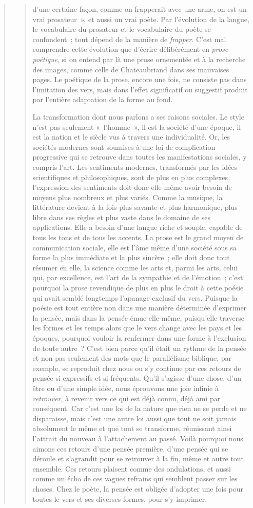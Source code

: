 \documentclass[french,twoside]{book} %
\begin{document}
\begin{verse}
\begin{verse}
d’une certaine façon, comme on frapperait avec une arme, on est un vrai prosateur », et aussi un vrai poète. Par l’évolution de la langue, le vocabulaire du prosateur et le vocabulaire du poète se confondent ; tout dépend de la manière de \emph{frapper}. C’est mal comprendre cette évolution que d’écrire délibérément en \emph{prose poétique}, si on entend par là une prose ornementée et à la recherche des images, comme celle de Chateaubriand dans ses mauvaises pages. Le poétique de la prose, encore une fois, ne consiste pas dans l’imitation des vers, mais dans l’effet significatif ou suggestif produit par l’entière adaptation de la forme au fond.\par
La transformation dont nous parlons a ses raisons sociales. Le style n’est pas seulement « l’homme », il est la société d’une époque, il est la nation et le siècle vus à travers une individualité. Or, les sociétés modernes sont soumises à une loi de complication progressive qui se retrouve dans toutes les manifestations sociales, y compris l’art. Les sentiments modernes, transformés par les idées scientifiques et philosophiques, sont de plus en plus complexes, l’expression des sentiments doit donc elle-même avoir besoin de moyens plus nombreux et plus variés. Comme la musique, la littérature devient à la fois plus savante et plus harmonique, plus libre dans ses règles et plus vaste dans le domaine de ses applications. Elle a besoin d’une langue riche et souple, capable de tous les tons et de tous les accents. La prose est le grand moyen de communication sociale, elle est l’âme même d’une société sous sa forme la plus immédiate et la plus sincère ; elle doit donc tout résumer en elle, la science comme les arts et, parmi les arts, celui qui, par excellence, est l’art de la sympathie et de l’émotion ; c’est pourquoi la prose revendique de plus en plus le droit à cette poésie qui avait semblé longtemps l’apanage exclusif du vers. Puisque la poésie est tout entière non dans une manière déterminée d’exprimer la pensée, mais dans la pensée émue elle-même, puisqu’elle traverse les formes et les temps alors que le vers change avec les pays et les époques, pourquoi vouloir la renfermer dans une forme à l’exclusion de toute autre ? C’est bien parce qu’il était un rythme de la pensée et non pas seulement des mots que le parallélisme biblique, par exemple, se reproduit chez nous ou s’y continue par ces retours de pensée si expressifs et si fréquents. Qu’il s’agisse d’une chose, d’un être ou d’une simple idée, nous éprouvons une joie infinie à \emph{retrouver}, à revenir vers ce qui est déjà connu, déjà ami par conséquent. Car c’est une loi de la nature que rien ne se perde et ne disparaisse, mais c’est une autre loi aussi que tout ne soit jamais absolument le même et que tout se transforme, réunissant ainsi l’attrait du nouveau à l’attachement au passé. Voilà pourquoi nous aimons ces retours d’une pensée première, d’une pensée qui se déroule et s’agrandit pour se retrouver à la fin, même et autre tout ensemble. Ces retours plaisent comme des ondulations, et aussi comme un écho de ces vagues refrains qui semblent passer sur les choses. Chez le poète, la pensée est obligée d’adopter une fois pour toutes le vers et ses diverses formes, pour s’y imprimer. 
\end{verse}
\end{verse}
\end{document}
